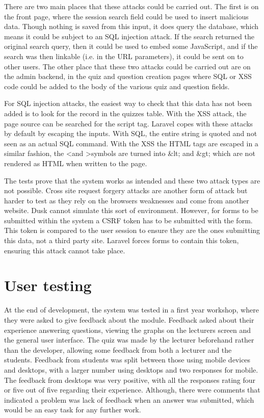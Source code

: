 There are two main places that these attacks could be carried out. The first is on the front page, where the session search field could be used to insert malicious data. Though nothing is saved from this input, it does query the database, which means it could be subject to an SQL injection attack. If the search returned the original search query, then it could be used to embed some JavaScript, and if the search was then linkable (i.e. in the URL parameters), it could be sent on to other users. The other place that these two attacks could be carried out are on the admin backend, in the quiz and question creation pages where SQL or XSS code could be added to the body of the various quiz and question fields.

For SQL injection attacks, the easiest way to check that this data has not been added is to look for the record in the quizzes table. With the XSS attack, the page source can be searched for the script tag. Laravel copes with these attacks by default by escaping the inputs\cite{laravel-web-attacks}. With SQL, the entire string is quoted and not seen as an actual SQL command. With the XSS the HTML tags are escaped in a similar fashion, the \textless and \textgreater symbols are turned into \&lt; and \&gt; which are not rendered as HTML when written to the page\cite{laravel-web-attacks}.

The tests prove that the system works as intended and these two attack types are not possible. Cross site request forgery attacks are another form of attack but harder to test as they rely on the browsers weaknesses and come from another website. Dusk cannot simulate this sort of environment. However, for forms to be submitted within the system a CSRF token has to be submitted with the form. This token is compared to the user session to ensure they are the ones submitting this data, not a third party site. Laravel forces forms to contain this token, ensuring this attack cannot take place. 

\section{User testing}
At the end of development, the system was tested in a first year workshop, where they were asked to give feedback about the module. Feedback asked about their experience answering questions, viewing the graphs on the lecturers screen and the general user interface. The quiz was made by the lecturer beforehand rather than the developer, allowing some feedback from both a lecturer and the students. Feedback from students was split between those using mobile devices and desktops, with a larger number using desktops and two responses for mobile. The feedback from desktops was very positive, with all the responses rating four or five out of five regarding their experience. Although, there were comments that indicated a problem was lack of feedback when an answer was submitted, which would be an easy task for any further work.

